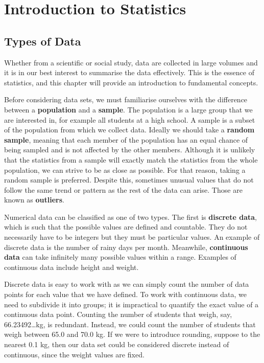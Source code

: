 \documentclass[../../main.tex]{subfiles}
\begin{document}
\chapter{Introduction to Statistics}

\section{Types of Data}
Whether from a scientific or social study, data are collected in large volumes and it is in our best interest to summarise the data effectively. This is the essence of statistics, and this chapter will provide an introduction to fundamental concepts.

Before considering data sets, we must familiarise ourselves with the difference between a \textbf{population} and a \textbf{sample}. The population is a large group that we are interested in, for example all students at a high school. A sample is a subset of the population from which we collect data. Ideally we should take a \textbf{random sample}, meaning that each member of the population has an equal chance of being sampled and is not affected by the other members. Although it is unlikely that the statistics from a sample will exactly match the statistics from the whole population, we can strive to be as close as possible. For that reason, taking a random sample is preferred. Despite this, sometimes unusual values that do not follow the same trend or pattern as the rest of the data can arise. Those are known as \textbf{outliers}.

Numerical data can be classified as one of two types. The first is \textbf{discrete data}, which is such that the possible values are defined and countable. They do not necessarily have to be integers but they must be particular values. An example of discrete data is the number of rainy days per month. Meanwhile, \textbf{continuous data} can take infinitely many possible values within a range. Examples of continuous data include height and weight.

Discrete data is easy to work with as we can simply count the number of data points for each value that we have defined. To work with continuous data, we need to subdivide it into groups; it is impractical to quantify the exact value of a continuous data point. Counting the number of students that weigh, say, 66.23492\dots kg, is redundant. Instead, we could count the number of students that weigh between 65.0 and 70.0 kg. If we were to introduce rounding, suppose to the nearest 0.1 kg, then our data set could be considered discrete instead of continuous, since the weight values are fixed.
\end{document}
